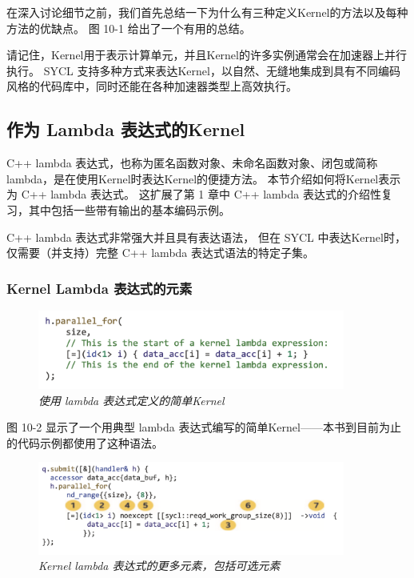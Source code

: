 在深入讨论细节之前，我们首先总结一下为什么有三种定义Kernel的方法以及每种方法的优缺点。 
图 10-1 给出了一个有用的总结。

请记住，Kernel用于表示计算单元，并且Kernel的许多实例通常会在加速器上并行执行。 
SYCL 支持多种方式来表达Kernel，以自然、无缝地集成到具有不同编码风格的代码库中，同时还能在各种加速器类型上高效执行。

\subsection{作为 Lambda 表达式的Kernel}
C++ lambda 表达式，也称为匿名函数对象、未命名函数对象、闭包或简称 lambda，是在使用Kernel时表达Kernel的便捷方法。 
本节介绍如何将Kernel表示为 C++ lambda 表达式。 
这扩展了第 1 章中 C++ lambda 表达式的介绍性复习，其中包括一些带有输出的基本编码示例。

C++ lambda 表达式非常强大并且具有表达语法，
但在 SYCL 中表达Kernel时，仅需要（并支持）完整 C++ lambda 表达式语法的特定子集。

\subsubsection{Kernel Lambda 表达式的元素}
\begin{figure}[H]
	\centering
	\includegraphics[width=0.9\textwidth]{figs/F10.2.png}
	\caption{\textit{使用 lambda 表达式定义的简单Kernel }}
\end{figure}

图 10-2 显示了一个用典型 lambda 表达式编写的简单Kernel——本书到目前为止的代码示例都使用了这种语法。

\begin{figure}[H]
	\centering
	\includegraphics[width=0.9\textwidth]{figs/F10.3.png}
	\caption{\textit{Kernel lambda 表达式的更多元素，包括可选元素 }}
\end{figure}


